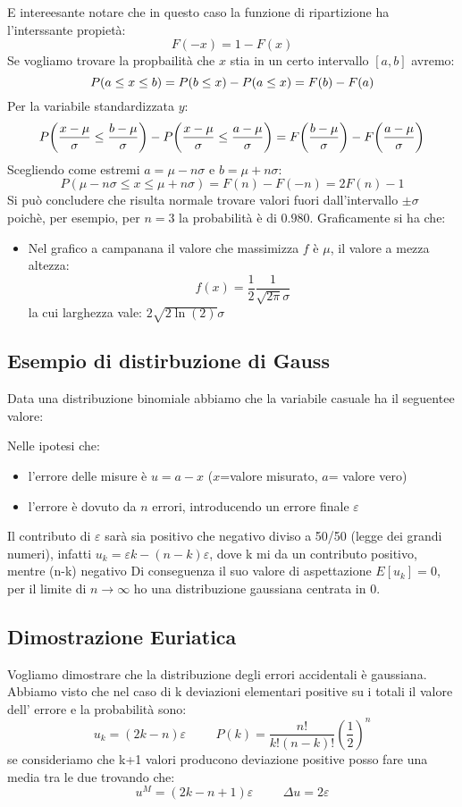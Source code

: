 \documentclass{article}
\begin{document}
E intereesante notare che in questo caso la funzione di ripartizione ha l'interssante propietà:
\[
F(-x)=1-F(x)
\]
Se vogliamo trovare la propbailità che $x$ stia in un certo intervallo $[a,b]$ avremo:
\[
P\pqty{a\leq x\leq b}=P(b \leq x) - P(a \leq x)=F(b)-F(a)
\]
Per la variabile standardizzata $y$:
\[
P\pqty{\frac{x- \mu}{\sigma} \leq \frac{b- \mu}{\sigma}} - P \pqty{\frac{x- \mu}{\sigma} \leq \frac{a- \mu}{\sigma}}=F\pqty{\frac{b- \mu}{\sigma}}-F\pqty{\frac{a- \mu}{\sigma}}
\]
Scegliendo come estremi $a= \mu - n\sigma$ e $b= \mu + n\sigma$:
\[
P(\mu - n\sigma \leq x \leq \mu + n\sigma)=F(n)-F(-n)=2F(n)-1
\]
Si può concludere che risulta normale trovare valori fuori dall'intervallo $\pm \sigma$ poichè, per esempio, per $n=3$ la probabilità è di $0.980$.
Graficamente si ha che:
\begin{itemize}
    \item Nel grafico a campanana il valore che massimizza $f$ è $\mu$, il valore a mezza altezza: 
    \[
    f(x)=\frac{1}{2} \frac{1}{\sqrt{2\pi}\sigma}
    \]
    la cui larghezza vale: $2\sqrt{2 \ln(2)}\sigma$

\end{itemize}    

\subsection{Esempio di distirbuzione di Gauss}
Data una distribuzione binomiale abbiamo che la variabile casuale ha il seguentee valore:

Nelle ipotesi che:
\begin{itemize}
    \item l'errore delle misure è $u=a-x$ ($x$=valore misurato, $a$= valore vero)
    \item l'errore è dovuto da $n$ errori, introducendo un errore finale $\varepsilon$
\end{itemize}
Il contributo di $\varepsilon$ sarà sia positivo che negativo diviso a 50/50 (legge dei grandi numeri), infatti $u_k= \varepsilon k - (n-k) \varepsilon$, dove k mi da un contributo positivo, mentre (n-k) negativo
Di conseguenza il suo valore di aspettazione $E[u_k]=0$, per il limite di $n \rightarrow \infty$ ho una distribuzione gaussiana centrata in 0.

\subsection{Dimostrazione Euriatica}
Vogliamo dimostrare che la distribuzione degli errori accidentali è gaussiana.
Abbiamo visto che nel caso di k deviazioni elementari positive su i totali il valore dell' errore e la probabilità sono:
\[
u_k=(2k-n) \varepsilon \hspace{1cm} P(k)=\frac{n!}{k!(n-k)!} (\frac{1}{2})^n
\]
se consideriamo che k+1 valori producono deviazione positive posso fare una media tra le due trovando che:
\[
u^M=(2k-n+1)\varepsilon \hspace{1cm} \Delta u = 2 \varepsilon
\]
\end{document}
